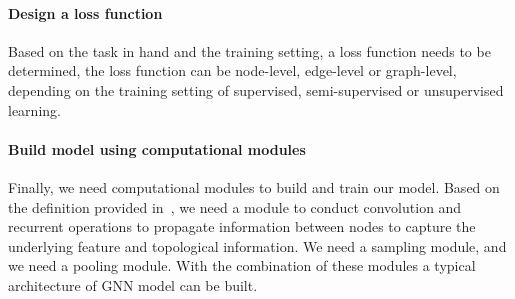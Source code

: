 \paragraph{Design a loss function}
Based on the task in hand and the training setting, a loss function needs to be determined, the loss function can be node-level, edge-level or graph-level, depending on the training setting of supervised, semi-supervised or unsupervised learning.

\paragraph{Build model using computational modules}
Finally, we need computational modules to build and train our model. Based on the definition provided in~\autocite{zhou20gnn}, we need a module to conduct convolution and recurrent operations to propagate information between nodes to capture the underlying feature and topological information. We need a sampling module, and we need a pooling module. With the combination of these modules a typical architecture of GNN model can be built.
